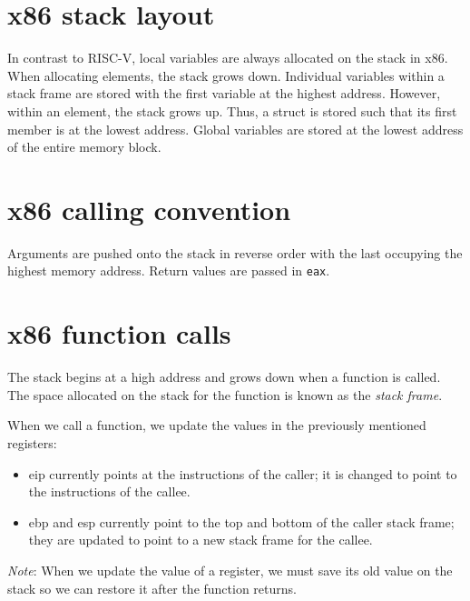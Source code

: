 \section{x86 stack layout}
In contrast to RISC-V, local variables are always allocated on the stack in x86. When allocating elements, the stack grows down. Individual variables within a stack frame are stored with the first variable at the highest address. However, within an element, the stack grows up. Thus, a struct is stored such that its first member is at the lowest address. Global variables are stored at the lowest address of the entire memory block.

\section{x86 calling convention}
Arguments are pushed onto the stack in reverse order with the last occupying the highest memory address. Return values are passed in \texttt{eax}.

\section{x86 function calls}
The stack begins at a high address and grows down when a function is called. The space allocated on the stack for the function is known as the \emph{stack frame}.

\medskip

When we call a function, we update the values in the previously mentioned registers:
\begin{itemize}
    \item eip currently points at the instructions of the caller; it is changed to point to the instructions of the callee.
    \item ebp and esp currently point to the top and bottom of the caller stack frame; they are updated to point to a new stack frame for the callee.
\end{itemize}

\emph{Note}: When we update the value of a register, we must save its old value on the stack so we can restore it after the function returns.

